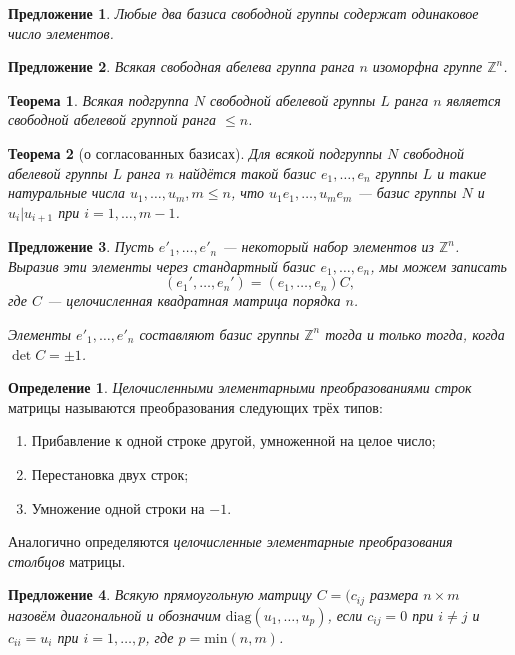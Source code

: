 \documentclass[a4paper]{article}
\theoremstyle{plain}
\newtheorem*{theorem}{Теорема}
\newtheorem{proposal}{Предложение}
\theoremstyle{definition}
\newtheorem{definition}{Определение}
\numberwithin{definition}{section}
\numberwithin{proposal}{section}
\begin{document}
\begin{proposal}
Любые два базиса свободной группы содержат одинаковое число элементов.
\end{proposal}

\begin{proposal}
Всякая свободная абелева группа ранга \(n\) изоморфна группе \(\mathbb{Z}^n\).
\end{proposal}

\begin{theorem}
Всякая подгруппа \(N\) свободной абелевой группы \(L\) ранга \(n\) является свободной абелевой группой ранга \(\leqslant n\).
\end{theorem}

\begin{theorem}[о согласованных базисах]
Для всякой подгруппы \(N\) свободной абелевой группы \(L\) ранга \(n\) найдётся такой базис \(e_1, \dots, e_n\) группы \(L\) и такие натуральные числа \(u_1, \dots, u_m, m \leqslant n\), что \(u_1e_1, \dots, u_me_m\) --- базис группы \(N\) и \(u_i | u_{i+1}\) при \(i = 1, \dots, m-1\).
\end{theorem}

\begin{proposal}
Пусть \(e'_1, \dots, e'_n\) --- некоторый набор элементов из \(\mathbb{Z}^n\). Выразив эти элементы через стандартный базис \(e_1, \dots, e_n\), мы можем записать
\begin{equation*}
	(e_1', \dots, e_n') = (e_1, \dots, e_n)C,
\end{equation*}
где \(C\) --- целочисленная квадратная матрица порядка \(n\).

Элементы \(e'_1, \dots, e'_n\) составляют базис группы \(\mathbb{Z}^n\) тогда и только тогда, когда \(\det C = \pm 1\).
\end{proposal}

\begin{definition}
\emph{Целочисленными элементарными преобразованиями строк} матрицы называются преобразования следующих трёх типов:
\begin{enumerate}
	\item Прибавление к одной строке другой, умноженной на целое число;
	\item Перестановка двух строк;
	\item Умножение одной строки на \(-1\).
\end{enumerate}
Аналогично определяются \emph{целочисленные элементарные преобразования столбцов} матрицы.
\end{definition}

\begin{proposal}
Всякую прямоугольную матрицу \(C = (c_{ij}\) размера \(n \times m\) назовём диагональной и обозначим \(\textrm{diag}(u_1, \dots, u_p)\), если \(c_{ij} = 0\) при \(i \neq j\) и \(c_{ii} = u_i\) при \(i = 1, \dots, p\), где \(p = \textrm{min}(n, m)\). 
\end{proposal}
\end{document}
